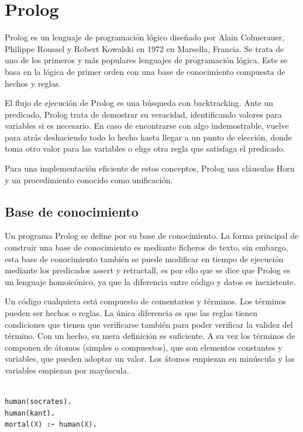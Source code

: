 \documentclass[12pt]{report} %
\begin{document}
\section{Prolog}

Prolog es un lenguaje de programación lógico diseñado por Alain Colmerauer, Philippe Roussel y Robert Kowalski en 1972 en Marsella, Francia. Se trata de uno de los primeros y más populares lenguajes de programación lógica. Este se basa en la lógica de primer orden con una base de conocimiento compuesta de hechos y reglas. 

El flujo de ejecución de Prolog es una búsqueda con backtracking. Ante un predicado, Prolog trata de demostrar su veracidad, identificando valores para variables si es necesario. En caso de encontrarse con algo indemostrable, vuelve para atrás deshaciendo todo lo hecho hasta llegar a un punto de elección, donde toma otro valor para las variables o elige otra regla que satisfaga el predicado.

Para una implementación eficiente de estos conceptos, Prolog usa cláusulas Horn y un procedimiento conocido como unificación.

\subsection{Base de conocimiento}

Un programa Prolog se define por su base de conocimiento. La forma principal de construir una base de conocimiento es mediante ficheros de texto, sin embargo, esta base de conocimiento también se puede modificar en tiempo de ejecución mediante los predicados assert y retractall, es por ello que se dice que Prolog es un lenguaje homoicónico, ya que la diferencia entre código y datos es inexistente.

Un código cualquiera está compuesto de comentarios y términos. Los términos pueden ser hechos o reglas. La única diferencia es que las reglas tienen condiciones que tienen que verificarse también para poder verificar la validez del término. Con un hecho, su mera definición es suficiente. A su vez los términos de componen de átomos (simples o compuestos), que son elementos constantes y variables, que pueden adoptar un valor. Los átomos empiezan en minúscula y las variables empiezan por mayúscula.

\begin{lstlisting}[language=Prolog]

human(socrates).
human(kant).
mortal(X) :- human(X).

\end{lstlisting}
\end{document}

